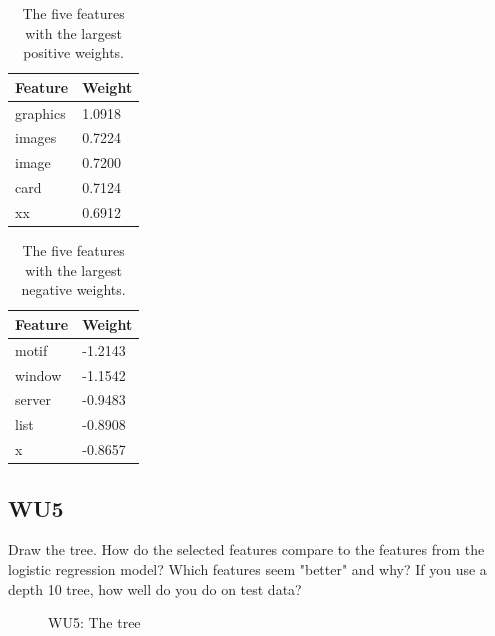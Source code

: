 \documentclass[a4paper,11pt]{article}
\begin{document}
\begin{table}[h!]
\begin{center}
    \caption{The five features with the largest positive weights.}
    \begin{tabular}{| l | l |}
    \hline
    Feature  & Weight \\ \hline
    graphics & 1.0918 \\ \hline %
    images   & 0.7224 \\ \hline %
    image    & 0.7200 \\ \hline %
    card     & 0.7124 \\ \hline %
    xx       & 0.6912 \\ \hline %
    \end{tabular}
    \label{tables:WU4Neg}
\end{center}
\end{table}

\begin{table}[!h]
\begin{center}
    \caption{The five features with the largest negative weights.}
    \begin{tabular}{| l | l |}
    \hline
    Feature &  Weight \\ \hline
    motif   & -1.2143 \\ \hline %
    window  & -1.1542 \\ \hline %
    server  & -0.9483 \\ \hline %
    list    & -0.8908 \\ \hline %
    x       & -0.8657 \\ \hline %
    \end{tabular}
    \label{tables:WU4Pos}
\end{center}
\end{table}

\subsection{WU5}
\textsf{ Draw the tree. How do the selected features compare to the
  features from the logistic regression model? Which features seem
  "better" and why? If you use a depth 10 tree, how well do you do on
  test data?}\\
\begin{figure}[h!]
  \caption{WU5: The tree}
  \centering
\end{figure}
\end{document}
